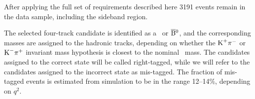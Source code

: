 After applying the full set of requirements described here 3191 events remain in the data sample, including the sideband region.

The selected four-track candidate is identified as a \PBz\ or $\overline{\textrm{B}}{}^{0}$, and the corresponding masses are assigned to the hadronic tracks, depending on whether the $\textrm{K}^{+}\pi^{-}$ or $\textrm{K}^{-}\pi^{+}$ invariant mass hypothesis is closest to the nominal \cPKstz\ mass.
The candidates assigned to the correct state will be called right-tagged, while we will refer to the candidates assigned to the incorrect state as mis-tagged.
The fraction of mis-tagged events is estimated from simulation to be in the range 12--14\%, depending on $q^2$.

